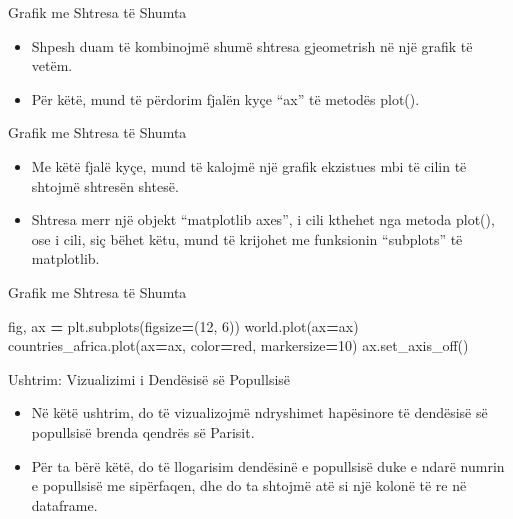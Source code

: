 \documentclass[
  ignorenonframetext,
]{beamer}
\newenvironment{Shaded}{\begin{snugshade}}{\end{snugshade}}
\newcommand{\DecValTok}[1]{\textcolor[rgb]{0.00,0.00,0.81}{#1}}
\newcommand{\NormalTok}[1]{#1}
\newcommand{\OperatorTok}[1]{\textcolor[rgb]{0.81,0.36,0.00}{\textbf{#1}}}
\newcommand{\StringTok}[1]{\textcolor[rgb]{0.31,0.60,0.02}{#1}}
\begin{document}
\begin{frame}{Grafik me Shtresa të Shumta}
\protect\hypertarget{grafik-me-shtresa-tuxeb-shumta}{}
\begin{itemize}
\item
  Shpesh duam të kombinojmë shumë shtresa gjeometrish në një grafik të
  vetëm.
\item
  Për këtë, mund të përdorim fjalën kyçe ``ax'' të metodës plot().
\end{itemize}
\end{frame}

\begin{frame}{Grafik me Shtresa të Shumta}
\protect\hypertarget{grafik-me-shtresa-tuxeb-shumta-1}{}
\begin{itemize}
\item
  Me këtë fjalë kyçe, mund të kalojmë një grafik ekzistues mbi të cilin
  të shtojmë shtresën shtesë.
\item
  Shtresa merr një objekt ``matplotlib axes'', i cili kthehet nga metoda
  plot(), ose i cili, siç bëhet këtu, mund të krijohet me funksionin
  ``subplots'' të matplotlib.
\end{itemize}
\end{frame}

\begin{frame}[fragile]{Grafik me Shtresa të Shumta}
\protect\hypertarget{grafik-me-shtresa-tuxeb-shumta-2}{}

\begin{Shaded}
\begin{Highlighting}[]
\NormalTok{fig, ax }\OperatorTok{=}\NormalTok{ plt.subplots(figsize}\OperatorTok{=}\NormalTok{(}\DecValTok{12}\NormalTok{, }\DecValTok{6}\NormalTok{))}
\NormalTok{world.plot(ax}\OperatorTok{=}\NormalTok{ax)}
\NormalTok{countries\_africa.plot(ax}\OperatorTok{=}\NormalTok{ax, color}\OperatorTok{=}\StringTok{\textquotesingle{}red\textquotesingle{}}\NormalTok{, markersize}\OperatorTok{=}\DecValTok{10}\NormalTok{)}
\NormalTok{ax.set\_axis\_off()}
\end{Highlighting}
\end{Shaded}
\end{frame}

\begin{frame}{Ushtrim: Vizualizimi i Dendësisë së Popullsisë}
\protect\hypertarget{ushtrim-vizualizimi-i-denduxebsisuxeb-suxeb-popullsisuxeb}{}
\begin{itemize}
\item
  Në këtë ushtrim, do të vizualizojmë ndryshimet hapësinore të dendësisë
  së popullsisë brenda qendrës së Parisit.
\item
  Për ta bërë këtë, do të llogarisim dendësinë e popullsisë duke e ndarë
  numrin e popullsisë me sipërfaqen, dhe do ta shtojmë atë si një kolonë
  të re në dataframe.
\end{itemize}
\end{frame}
\end{document}
